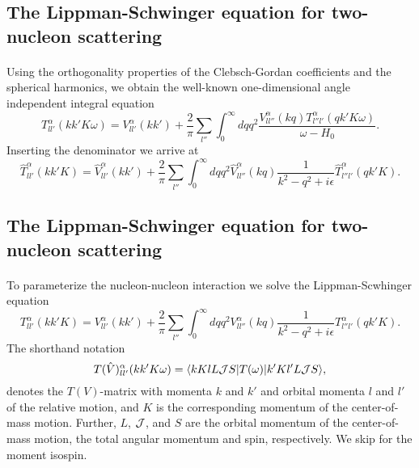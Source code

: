 \documentclass[%
twoside,                 %
final,                   %
10pt]{article}
\begin{document}
\subsection*{The Lippman-Schwinger equation for two-nucleon scattering}

\paragraph{}
Using the orthogonality
properties of the Clebsch-Gordan coefficients and the spherical harmonics,
we obtain the well-known
one-dimensional angle independent
integral equation
\[
   T_{ll'}^{\alpha}(kk'K\omega)=V_{ll'}^{\alpha}(kk')
   +\frac{2}{\pi}\sum_{l''}\int_{0}^{\infty} dqq^2
   \frac{V_{ll''}^{\alpha}(kq)
   T_{l''l'}^{\alpha}(qk'K\omega)}
   {\omega -H_0}.
\]
Inserting the denominator we arrive at 
\[
   \hat{T}_{ll'}^{\alpha}(kk'K)=\hat{V}_{ll'}^{\alpha}(kk')
   +\frac{2}{\pi}\sum_{l''}\int_{0}^{\infty} dqq^2
   \hat{V}_{ll''}^{\alpha}(kq)
   \frac{1}{k^2-q^2 +i\epsilon}
   \hat{T}_{l''l'}^{\alpha}(qk'K).
\]



\subsection*{The Lippman-Schwinger equation for two-nucleon scattering}

\paragraph{}
To parameterize the nucleon-nucleon interaction we solve the Lippman-Scwhinger
equation
\[
   T_{ll'}^{\alpha}(kk'K)=V_{ll'}^{\alpha}(kk')
   +\frac{2}{\pi}\sum_{l''}\int_{0}^{\infty} dqq^2
   V_{ll''}^{\alpha}(kq)
   \frac{1}{k^2-q^2 +i\epsilon}
   T_{l''l'}^{\alpha}(qk'K).
\]
The  shorthand notation
\[
    T(\hat{V})_{ll'}^{\alpha}(kk'K\omega)=\langle kKlL{\cal J}S\vert T(\omega)\vert k'Kl'L{\cal J}S\rangle,
\]
denotes the $T(V)$-matrix
with momenta $k$ and $k'$ and orbital momenta $l$ and $l'$
of the relative motion, and
$K$ is the corresponding momentum of
the center-of-mass motion. Further, $L$, ${\cal J}$, and $S$
are the orbital momentum of the center-of-mass motion, the
total angular momentum and
spin, respectively. We skip for the moment isospin.



\end{document}
